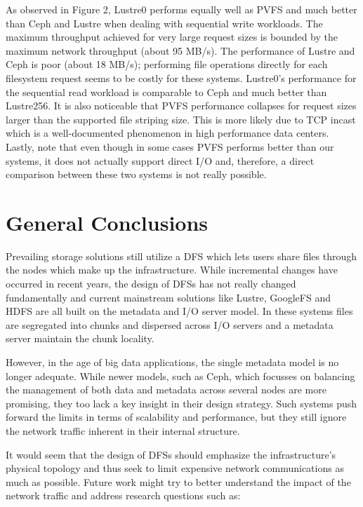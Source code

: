 \documentclass[11pt]{article}
\begin{document}

As observed in Figure 2, Lustre0 performs equally well as PVFS and much 
better than Ceph and Lustre when dealing with sequential write workloads. 
The maximum throughput achieved for very large request sizes is bounded 
by the maximum network throughput (about 95 MB/s). The performance of 
Lustre and Ceph is poor (about 18 MB/s); performing file operations 
directly for each filesystem request seems to be costly for these systems. 
Lustre0’s performance for the sequential read workload is comparable to 
Ceph and much better than Lustre256. It is also noticeable that PVFS 
performance collapses for request sizes larger than the supported 
file striping size. This is more likely due to TCP incast which is a 
well-documented phenomenon in high performance data centers. Lastly, 
note that even though in some cases PVFS performs better than our 
systems, it does not actually support direct I/O and, therefore, a 
direct comparison between these two systems is not really possible.






\section{General Conclusions}
Prevailing storage solutions still utilize a DFS which lets users share 
files through the nodes which make up the infrastructure. While incremental 
changes have occurred in recent years, the design of DFSs has not really 
changed fundamentally and current mainstream solutions like Lustre, GoogleFS  
and HDFS are all built on the metadata and I/O server model.  In these 
systems files are segregated into chunks and dispersed across I/O servers and 
a metadata server maintain the chunk locality. 

However, in the age of big data applications, the single metadata model is no 
longer adequate. While newer models, such as Ceph, which focusses on balancing 
the management of both data and metadata across several nodes are more promising, 
they too lack a key insight in their design strategy. Such systems push forward 
the limits in terms of scalability and performance, but they still ignore the 
network traffic inherent in their internal structure.

It would seem that the design of DFSs should emphasize the infrastructure’s 
physical topology and thus seek to limit expensive network communications as 
much as possible. Future work might try to better understand the impact of the 
network traffic and address research questions such as:
\end{document}
